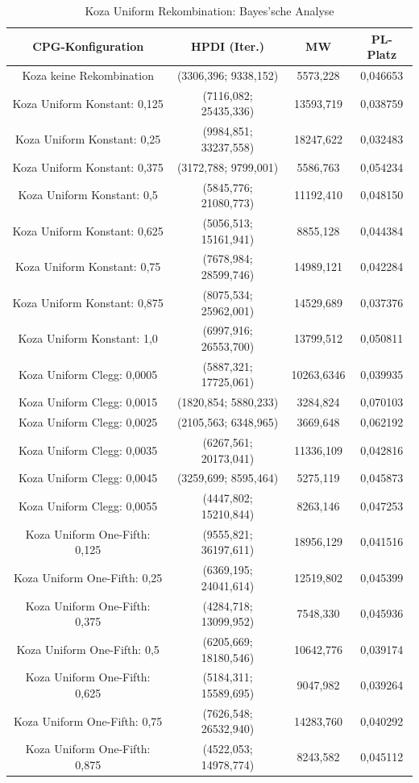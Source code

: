 \begin{table}[H]
	\centering
	\begin{tabular}{c | c | c | c}
		\textbf{CPG-Konfiguration} & \textbf{HPDI (Iter.)} & \textbf{MW} & \textbf{PL-Platz}\\
		\hline
		Koza keine Rekombination & (3306,396; 9338,152) & 5573,228 & 0,046653\\
		\hline
		Koza Uniform Konstant: 0,125 & (7116,082; 25435,336) & 13593,719 & 0,038759\\
		\hline
		Koza Uniform Konstant: 0,25 & (9984,851; 33237,558) & 18247,622 & 0,032483\\
		\hline
		Koza Uniform Konstant: 0,375 & (3172,788; 9799,001) & 5586,763 & 0,054234\\
		\hline
		Koza Uniform Konstant: 0,5 & (5845,776; 21080,773) & 11192,410 & 0,048150\\
		\hline
		Koza Uniform Konstant: 0,625 & (5056,513; 15161,941) & 8855,128 & 0,044384\\
		\hline
		Koza Uniform Konstant: 0,75 & (7678,984; 28599,746) & 14989,121 & 0,042284\\
		\hline
		Koza Uniform Konstant: 0,875 & (8075,534; 25962,001) & 14529,689 & 0,037376\\
		\hline
		Koza Uniform Konstant: 1,0 & (6997,916; 26553,700) & 13799,512 & 0,050811\\
		\hline
		Koza Uniform Clegg: 0,0005 & (5887,321; 17725,061) & 10263,6346 & 0,039935\\
		\hline
		Koza Uniform Clegg: 0,0015 & (1820,854; 5880,233) & 3284,824 & 0,070103\\
		\hline
		Koza Uniform Clegg: 0,0025 & (2105,563; 6348,965) & 3669,648 & 0,062192\\
		\hline
		Koza Uniform Clegg: 0,0035 & (6267,561; 20173,041) & 11336,109 & 0,042816\\
		\hline
		Koza Uniform Clegg: 0,0045 & (3259,699; 8595,464) & 5275,119 & 0,045873\\
		\hline
		Koza Uniform Clegg: 0,0055 & (4447,802; 15210,844) & 8263,146 & 0,047253\\
		\hline
		Koza Uniform One-Fifth: 0,125 & (9555,821; 36197,611) & 18956,129 & 0,041516\\
		\hline
		Koza Uniform One-Fifth: 0,25 & (6369,195; 24041,614) & 12519,802 & 0,045399\\
		\hline
		Koza Uniform One-Fifth: 0,375 & (4284,718; 13099,952) & 7548,330 & 0,045936\\
		\hline
		Koza Uniform One-Fifth: 0,5 & (6205,669; 18180,546) & 10642,776 & 0,039174\\
		\hline
		Koza Uniform One-Fifth: 0,625 & (5184,311; 15589,695) & 9047,982 & 0,039264\\
		\hline
		Koza Uniform One-Fifth: 0,75 & (7626,548; 26532,940) & 14283,760 & 0,040292\\
		\hline
		Koza Uniform One-Fifth: 0,875 & (4522,053; 14978,774) & 8243,582 & 0,045112\\
	\end{tabular}
	\label{table:kozaUniformBayesian}
	\caption{Koza Uniform Rekombination: Bayes'sche Analyse}
\end{table}


